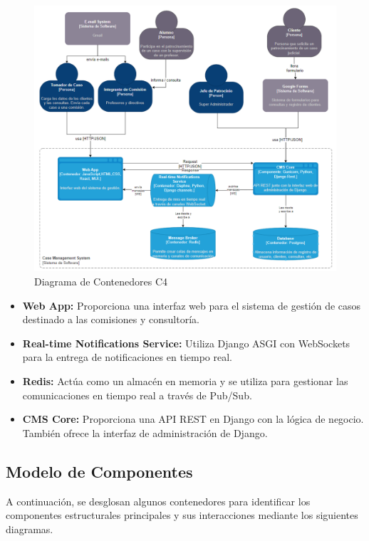 \begin{figure}[h]
\centering
\includegraphics[width=1\linewidth]{fig/c4-2.png}
\caption{Diagrama de Contenedores C4}
\label{fig:c4-02}
\end{figure}

\begin{itemize}
\item \textbf{Web App:} Proporciona una interfaz web para el sistema de gestión de casos destinado a las comisiones y consultoría.
\item \textbf{Real-time Notifications Service:} Utiliza Django ASGI con WebSockets para la entrega de notificaciones en tiempo real.
\item \textbf{Redis:} Actúa como un almacén en memoria y se utiliza para gestionar las comunicaciones en tiempo real a través de Pub/Sub.
\item \textbf{CMS Core:} Proporciona una API REST en Django con la lógica de negocio. También ofrece la interfaz de administración de Django.
\end{itemize}




\subsection{Modelo de Componentes}
A continuación, se desglosan algunos contenedores para identificar los componentes estructurales principales y sus interacciones mediante los siguientes diagramas.

